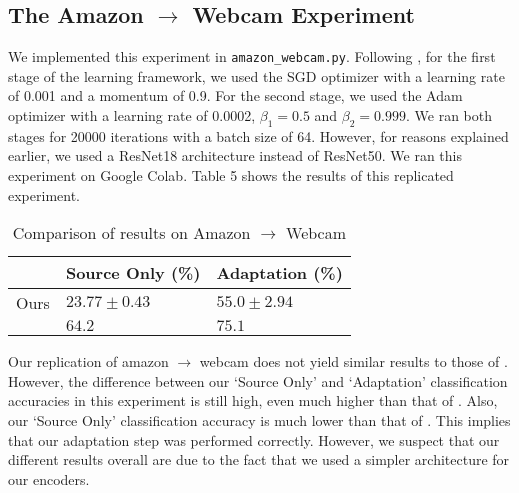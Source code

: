 \documentclass[14pt]{extarticle}
\begin{document}
		\subsection{The Amazon $\rightarrow$ Webcam Experiment}
		We implemented this experiment in \texttt{amazon\_webcam.py}. Following \cite{adda}, for the first stage of the learning framework, we used the SGD optimizer with a learning rate of 0.001 and a momentum of 0.9. For the second stage, we used the Adam optimizer with a learning rate of 0.0002, $\beta_1 = 0.5$ and $\beta_2 = 0.999$. We ran both stages for 20000 iterations with a batch size of 64. However, for reasons explained earlier, we used a ResNet18 architecture instead of ResNet50. We ran this experiment on Google Colab. Table 5 shows the results of this replicated experiment.
		\begin{table}[H]
			\centering
			\begin{tabular}{|P{40mm}|P{40mm}|P{40mm}|}
				\hline
				 & Source Only (\%) & Adaptation (\%)\\
				\hline
				Ours & $23.77 \pm 0.43$ & $55.0 \pm 2.94$\\
				\hline
				\cite{adda} & $64.2$ & $75.1$\\
				\hline
			\end{tabular}
			\caption{Comparison of results on Amazon $\rightarrow$ Webcam}
		\end{table}
		Our replication of amazon $\rightarrow$ webcam does not yield similar results to those of \cite{adda}. However, the difference between our `Source Only' and `Adaptation' classification accuracies in this experiment is still high, even much higher than that of \cite{adda}. Also, our `Source Only' classification accuracy is much lower than that of \cite{adda}. This implies that our adaptation step was performed correctly. However, we suspect that our different results overall are due to the fact that we used a simpler architecture for our encoders.
\end{document}
